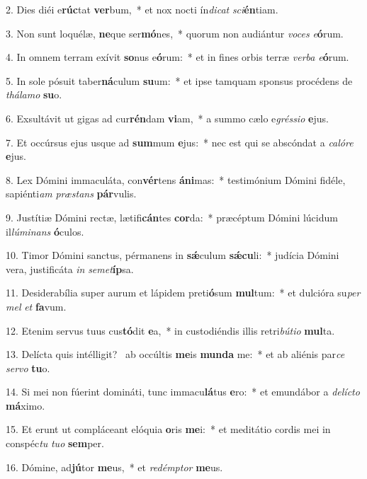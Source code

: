 2. Dies diéi e\textbf{rúc}tat \textbf{ver}bum,~*  et nox nocti ín\textit{di}\textit{cat} \textit{sci}\textbf{én}tiam.\

3. Non sunt loquélæ, \textbf{ne}que ser\textbf{mó}nes,~*  quorum non audiántur \textit{vo}\textit{ces} \textit{e}\textbf{ó}rum.\

4. In omnem terram exívit \textbf{so}nus e\textbf{ó}rum:~*  et in fines orbis terræ \textit{ver}\textit{ba} \textit{e}\textbf{ó}rum.\

5. In sole pósuit taber\textbf{ná}culum \textbf{su}um:~*  et ipse tamquam sponsus procédens de \textit{thá}\textit{la}\textit{mo} \textbf{su}o.\

6. Exsultávit ut gigas ad cur\textbf{rén}dam \textbf{vi}am,~*  a summo cælo e\textit{grés}\textit{si}\textit{o} \textbf{e}jus.\

7. Et occúrsus ejus usque ad \textbf{sum}mum \textbf{e}jus:~*  nec est qui se abscóndat a \textit{ca}\textit{ló}\textit{re} \textbf{e}jus.\

8. Lex Dómini immaculáta, con\textbf{vér}tens \textbf{á}\textbf{ni}mas:~*  testimónium Dómini fidéle, sapiénti\textit{am} \textit{præ}\textit{stans} \textbf{pár}vulis.\

9. Justítiæ Dómini rectæ, lætifi\textbf{cán}tes \textbf{cor}da:~*  præcéptum Dómini lúcidum il\textit{lú}\textit{mi}\textit{nans} \textbf{ó}culos.\

10. Timor Dómini sanctus, pérmanens in \textbf{sǽ}culum \textbf{sǽ}\textbf{cu}li:~*  judícia Dómini vera, justificáta \textit{in} \textit{se}\textit{met}\textbf{íp}sa.\

11. Desiderabília super aurum et lápidem preti\textbf{ó}sum \textbf{mul}tum:~*  et dulcióra su\textit{per} \textit{mel} \textit{et} \textbf{fa}vum.\

12. Etenim servus tuus cus\textbf{tó}dit \textbf{e}a,~*  in custodiéndis illis retri\textit{bú}\textit{ti}\textit{o} \textbf{mul}ta.\

13. Delícta quis intélligit? \dag\  ab occúltis \textbf{me}is \textbf{mun}\textbf{da} me:~*  et ab aliénis par\textit{ce} \textit{ser}\textit{vo} \textbf{tu}o.\

14. Si mei non fúerint domináti, tunc immacu\textbf{lá}tus \textbf{e}ro:~*  et emundábor a \textit{de}\textit{líc}\textit{to} \textbf{má}ximo.\

15. Et erunt ut compláceant elóquia \textbf{o}ris \textbf{me}i:~*  et meditátio cordis mei in conspéc\textit{tu} \textit{tu}\textit{o} \textbf{sem}per.\

16. Dómine, ad\textbf{jú}tor \textbf{me}us,~*  et \textit{red}\textit{émp}\textit{tor} \textbf{me}us.\

